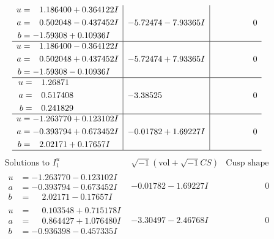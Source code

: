 \documentclass[1p]{elsarticle_modified}
\theoremstyle{definition}
\newcommand{\I}{\sqrt{-1}}
\begin{document}
$$\begin{array}{c|c|c}
\begin{aligned}
u &= \phantom{-}1.186400 + 0.364122 I \\
a &= \phantom{-}0.502048 - 0.437452 I \\
b &= -1.59308 + 0.10936 I\end{aligned}
 & -5.72474 - 7.93365 I & \phantom{-0.000000 } 0 \\ \hline\begin{aligned}
u &= \phantom{-}1.186400 - 0.364122 I \\
a &= \phantom{-}0.502048 + 0.437452 I \\
b &= -1.59308 - 0.10936 I\end{aligned}
 & -5.72474 + 7.93365 I & \phantom{-0.000000 } 0 \\ \hline\begin{aligned}
u &= \phantom{-}1.26871\phantom{ +0.000000I} \\
a &= \phantom{-}0.517408\phantom{ +0.000000I} \\
b &= \phantom{-}0.241829\phantom{ +0.000000I}\end{aligned}
 & -3.38525\phantom{ +0.000000I} & \phantom{-0.000000 } 0 \\ \hline\begin{aligned}
u &= -1.263770 + 0.123102 I \\
a &= -0.393794 + 0.673452 I \\
b &= \phantom{-}2.02171 + 0.17657 I\end{aligned}
 & -0.01782 + 1.69227 I & \phantom{-0.000000 } 0\\
 \hline 
 \end{array}$$\newpage$$\begin{array}{c|c|c}  
\text{Solutions to }I^u_{1}& \I (\text{vol} + \sqrt{-1}CS) & \text{Cusp shape}\\
 \hline 
\begin{aligned}
u &= -1.263770 - 0.123102 I \\
a &= -0.393794 - 0.673452 I \\
b &= \phantom{-}2.02171 - 0.17657 I\end{aligned}
 & -0.01782 - 1.69227 I & \phantom{-0.000000 } 0 \\ \hline\begin{aligned}
u &= \phantom{-}0.103548 + 0.715178 I \\
a &= \phantom{-}0.864427 + 1.076480 I \\
b &= -0.936398 - 0.457335 I\end{aligned}
 & -3.30497 - 2.46768 I & \phantom{-0.000000 } 0 \\ \hline\begin{aligned}

\end{aligned}
\end{array}$$
\end{document}
